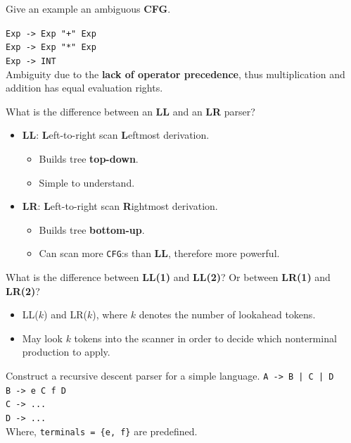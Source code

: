 \documentclass[11pt]{beamer}
\begin{document}
\begin{frame}

\begin{block}{Give an example an ambiguous \textbf{CFG}.}

\texttt{Exp -> Exp "+" Exp }\\
\texttt{Exp -> Exp "*" Exp }\\
\texttt{Exp -> INT}\\
Ambiguity due to the \textbf{lack of operator precedence}, thus multiplication and addition has equal evaluation rights.
\end{block}

\begin{block}{What is the difference between an \textbf{LL }and an \textbf{LR }parser?}
\begin{itemize}
\item \textbf{LL}: \textbf{L}eft-to-right scan \textbf{L}eftmost derivation.
\begin{itemize}
\item Builds tree \textbf{top-down}.
\item Simple to understand.
\end{itemize}
\item \textbf{LR}: \textbf{L}eft-to-right scan \textbf{R}ightmost derivation.
\begin{itemize}
\item Builds tree \textbf{bottom-up}.
\item Can scan more \texttt{CFG}:s than \textbf{LL}, therefore more powerful.
\end{itemize}
\end{itemize}
\end{block}

\end{frame}

\begin{frame}

\begin{block}{What is the difference between \textbf{LL(1)} and \textbf{LL(2)}? Or between \textbf{LR(1)} and \textbf{LR(2)}?}
\begin{itemize}
\item LL($k$) and LR($k$), where $k$ denotes the number of lookahead tokens.
\item May look $k$ tokens into the scanner in order to decide which nonterminal production to apply.
\end{itemize}
\end{block}

\begin{block}{Construct a recursive descent parser for a simple language.}
\texttt{A -> B | C | D }\\
\texttt{B -> e C f D }\\
\texttt{C -> ...}\\
\texttt{D -> ...}\\
Where, \texttt{terminals = \{e, f\}} are predefined.
\end{block}

\end{frame}
\end{document}
